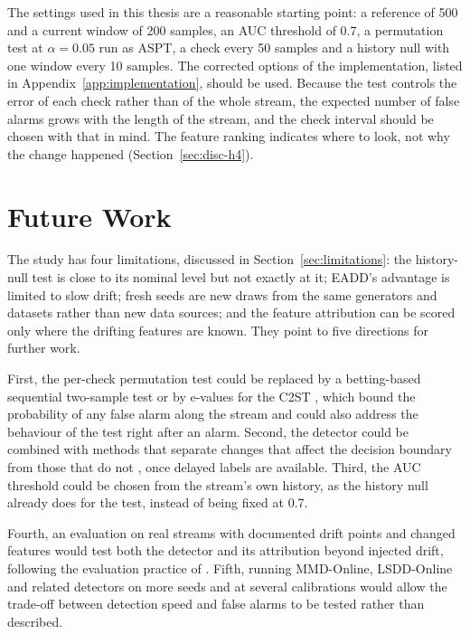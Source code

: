 The settings used in this thesis are a reasonable starting point: a reference of 500 and a current window of 200 samples, an AUC threshold of 0.7, a permutation test at $\alpha = 0.05$ run as ASPT, a check every 50 samples and a history null with one window every 10 samples. The corrected options of the implementation, listed in Appendix~\ref{app:implementation}, should be used. Because the test controls the error of each check rather than of the whole stream, the expected number of false alarms grows with the length of the stream, and the check interval should be chosen with that in mind. The feature ranking indicates where to look, not why the change happened (Section~\ref{sec:disc-h4}).

\section{Future Work}

The study has four limitations, discussed in Section~\ref{sec:limitations}: the history-null test is close to its nominal level but not exactly at it; EADD's advantage is limited to slow drift; fresh seeds are new draws from the same generators and datasets rather than new data sources; and the feature attribution can be scored only where the drifting features are known. They point to five directions for further work.

First, the per-check permutation test could be replaced by a betting-based sequential two-sample test \citep{PodkopaevRamdas2023} or by e-values for the C2ST \citep{EC2ST2024}, which bound the probability of any false alarm along the stream and could also address the behaviour of the test right after an alarm. Second, the detector could be combined with methods that separate changes that affect the decision boundary from those that do not \citep{GaussianSplit2024, HDPD2024}, once delayed labels are available. Third, the AUC threshold could be chosen from the stream's own history, as the history null already does for the test, instead of being fixed at 0.7.

Fourth, an evaluation on real streams with documented drift points and changed features would test both the detector and its attribution beyond injected drift, following the evaluation practice of \citet{CerqueiraKDD2026}. Fifth, running MMD-Online, LSDD-Online and related detectors on more seeds and at several calibrations would allow the trade-off between detection speed and false alarms to be tested rather than described.

